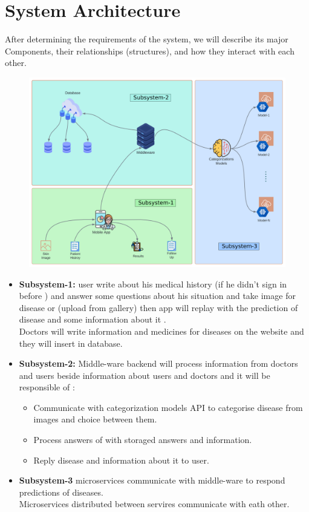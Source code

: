 \section{System Architecture}
After determining the requirements of the system, we will describe its major 
Components, their relationships (structures), and how they interact with each
other.
\begin{figure}[!ht]
\centering
\includegraphics[width = 5.5in]{backmatter/figures/SysArch.png}
\end{figure}
\vspace{0.25cm}
\begin{itemize}
  \item \textbf{Subsystem-1:} user write about his medical history (if he didn’t sign in before ) and answer some questions about his situation and take image for disease or (upload from gallery) then app will replay with the prediction of disease and some information about it .\\Doctors will write information and medicines for diseases on the website and they will insert in database.\\
  \item \textbf{Subsystem-2:} Middle-ware backend will process information from doctors and users 
  beside information about users and doctors  and it will be responsible of 
  :\\
    \begin{itemize}
        \item Communicate with categorization models API to categorise disease from images and choice between them.\\
        \item Process answers of with storaged answers and information.\\
        \item Reply disease and information about it to user.\\
    \end{itemize}
  \item \textbf{Subsystem-3} microservices communicate with middle-ware to respond predictions of diseases.\\Microservices distributed between servires communicate with eath other.
\end{itemize}
